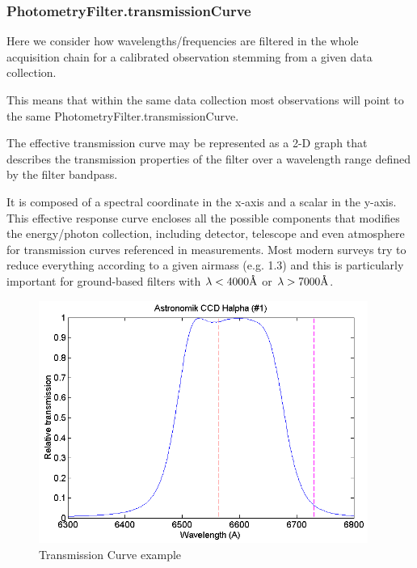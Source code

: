 \documentclass[11pt,a4paper]{ivoa}
\newcommand{\angstrom}{\textup{\AA}}
\begin{document}

\subsubsection{PhotometryFilter.transmissionCurve}
Here we consider how wavelengths/frequencies are filtered in the whole acquisition chain for a calibrated observation stemming from a given data collection.
\par

This means that within the same data collection most observations will point to the same PhotometryFilter.transmissionCurve.
\par

The effective transmission curve may be represented as a 2-D graph that describes the transmission properties of the filter over a wavelength range defined by the filter bandpass. 
\par

It is composed of a spectral coordinate in the x-axis and a scalar in the y-axis. This effective response curve encloses all the possible components that modifies the energy/photon collection, including detector, telescope and even atmosphere for transmission curves referenced in measurements. Most modern surveys try to reduce everything according to a given airmass (e.g. 1.3) and this is particularly important for ground-based filters with $\lambda < 4000 \angstrom $ or  $\lambda > 7000 \angstrom $.
\par

\begin{figure}[H]
	\begin{center}
		\includegraphics[width=4.24in,height=3.12in]{./media/image25.png}
		\caption{Transmission Curve example}
	\end{center}
\end{figure}
\end{document}
